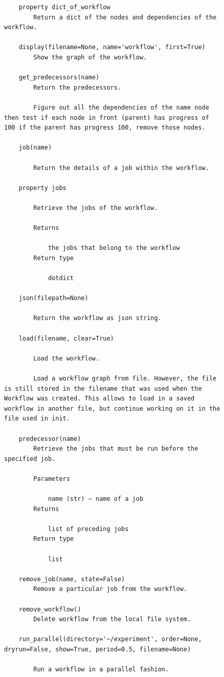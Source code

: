 \begin{figure}[htb]
\begin{verbatim}
    property dict_of_workflow
        Return a dict of the nodes and dependencies of the workflow.

    display(filename=None, name='workflow', first=True)
        Show the graph of the workflow.

    get_predecessors(name)
        Return the predecessors.

        Figure out all the dependencies of the name node then test if each node in front (parent) has progress of 100 if the parent has progress 100, remove those nodes.

    job(name)

        Return the details of a job within the workflow.

    property jobs

        Retrieve the jobs of the workflow.

        Returns

            the jobs that belong to the workflow
        Return type

            dotdict

    json(filepath=None)

        Return the workflow as json string.

    load(filename, clear=True)

        Load the workflow.

        Load a workflow graph from file. However, the file is still stored in the filename that was used when the Workflow was created. This allows to load in a saved workflow in another file, but continue working on it in the file used in init.

    predecessor(name)
        Retrieve the jobs that must be run before the specified job.

        Parameters

            name (str) – name of a job
        Returns

            list of preceding jobs
        Return type

            list

    remove_job(name, state=False)
        Remove a particular job from the workflow.

    remove_workflow()
        Delete workflow from the local file system.

    run_parallel(directory='~/experiment', order=None, dryrun=False, show=True, period=0.5, filename=None)

        Run a workflow in a parallel fashion.


\end{verbatim}
\end{figure}
